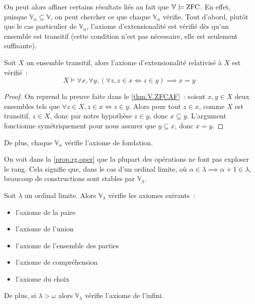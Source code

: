 On peut alors affiner certains résultats liés au fait que
$\mathbb V \models \operatorname{ZFC}$. En effet, puisque
$\mathbb V_\alpha \subseteq\mathbb V$, on peut chercher ce que chaque
$\mathbb V_\alpha$ vérifie. Tout d'abord, plutôt que le cas particulier de
$\mathbb V_\alpha$, l'axiome d'extensionalité est vérifié dès qu'un ensemble est
transitif (cette condition n'est pas nécessaire, elle est seulement suffisante).

\begin{property}
  Soit $X$ un ensemble transitif, alors l'axiome d'extensionalité relativisé à
  $X$ est vérifié~:
  \[X \models \forall x,\forall y, (\forall z, z \in x\iff z \in y) \implies
  x = y\]
\end{property}

\begin{proof}
  On reprend la preuve faite dans le \cref{thm.V.ZFCAF}~: soient $x,y\in X$ deux
  ensembles tels que $\forall z \in X, z \in x \iff z \in y$. Alors pour tout
  $z\in x$, comme $X$ est transitif, $z\in X$, donc par notre hypothèse
  $z\in y$, donc $x\subseteq y$. L'argument fonctionne symétriquement pour nous
  assurer que $y\subseteq x$, donc $x = y$.
\end{proof}

De plus, chaque $\mathbb V_\alpha$ vérifie l'axiome de fondation.

On voit dans la \cref{prop.rg.oper} que la plupart des opérations ne font pas
exploser le rang. Cela signifie que, dans le cas d'un ordinal limite, où
$\alpha \in \lambda \implies \alpha + 1 \in \lambda$, beaucoup de constructions
sont stables par $\mathbb V_\lambda$.

\begin{property}
  Soit $\lambda$ un ordinal limite. Alors $\mathbb V_\lambda$ vérifie les
  axiomes suivants~:
  \begin{itemize}
  \item l'axiome de la paire
  \item l'axiome de l'union
  \item l'axiome de l'ensemble des parties
  \item l'axiome de compréhension
  \item l'axiome du choix
  \end{itemize}

  De plus, si $\lambda > \omega$ alors $\mathbb V_\lambda$ vérifie l'axiome de
  l'infini.
\end{property}

